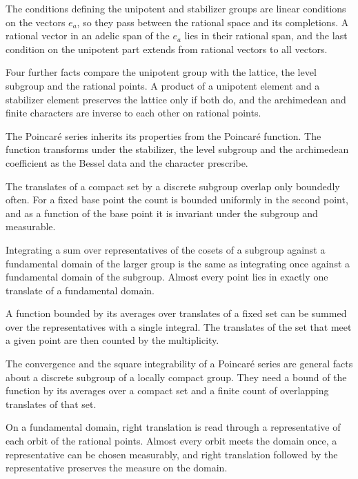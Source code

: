 The conditions defining the unipotent and stabilizer groups are linear conditions on the vectors $e_a$,
so they pass between the rational space and its completions. A rational vector in an adelic span of the
$e_a$ lies in their rational span, and the last condition on the unipotent part extends from rational
vectors to all vectors.

Four further facts compare the unipotent group with the lattice, the level subgroup and the rational
points. A product of a unipotent element and a stabilizer element preserves the lattice only if both do,
and the archimedean and finite characters are inverse to each other on rational points.

The Poincaré series inherits its properties from the Poincaré function. The function transforms
under the stabilizer, the level subgroup and the archimedean coefficient as the Bessel data and the
character prescribe.

The translates of a compact set by a discrete subgroup overlap only boundedly often. For a fixed base
point the count is bounded uniformly in the second point, and as a function of the base point it is
invariant under the subgroup and measurable.

Integrating a sum over representatives of the cosets of a subgroup against a fundamental domain of
the larger group is the same as integrating once against a fundamental domain of the subgroup. Almost
every point lies in exactly one translate of a fundamental domain.

A function bounded by its averages over translates of a fixed set can be summed over the
representatives with a single integral. The translates of the set that meet a given point are then
counted by the multiplicity.

The convergence and the square integrability of a Poincaré series are general facts about a discrete
subgroup of a locally compact group. They need a bound of the function by its averages over a compact
set and a finite count of overlapping translates of that set.

On a fundamental domain, right translation is read through a representative of each orbit of the
rational points. Almost every orbit meets the domain once, a representative can be chosen measurably,
and right translation followed by the representative preserves the measure on the domain.

